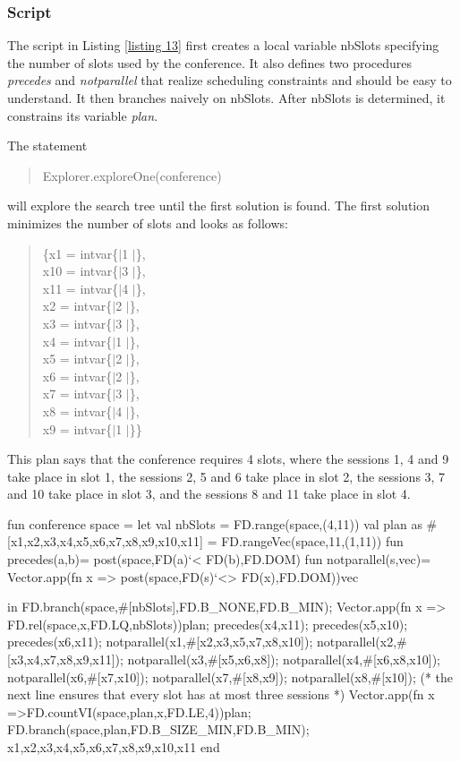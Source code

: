 \documentclass[a4paper,halfparskip]{scrartcl}
\begin{document}
\subsubsection{Script}
The script in Listing \ref{listing 13} first creates a local
variable nbSlots specifying the number of slots used by the 
conference. It also defines two procedures \emph{precedes} and
\emph{notparallel} that realize scheduling constraints and
should be easy to understand. It then branches naively on
nbSlots. After nbSlots is determined, it constrains its 
variable \emph{plan}.

The statement 
\begin{quote}
Explorer.exploreOne(conference)
\end{quote}
will explore the search tree until the first solution is found. 
The first solution minimizes the number of slots and looks as follows: 
\begin{quote}
\{x1 = intvar\{$|$1 $|$\},\\
  x10 = intvar\{$|$3 $|$\}, \\
 x11 = intvar\{$|$4 $|$\}, \\
 x2 = intvar\{$|$2 $|$\}, \\
 x3 = intvar\{$|$3 $|$\},\\ 
 x4 = intvar\{$|$1 $|$\}, \\
 x5 = intvar\{$|$2 $|$\}, \\
 x6 = intvar\{$|$2 $|$\}, \\
 x7 = intvar\{$|$3 $|$\}, \\
 x8 = intvar\{$|$4 $|$\}, \\
 x9 = intvar\{$|$1 $|$\}\}
\end{quote}
This plan says that the conference requires 4 slots, 
where the sessions 1, 4 and 9 take place in slot 1, the sessions 2, 
5 and 6 take place in slot 2, the sessions 3, 7 and 10 take place in 
slot 3, and the sessions 8 and 11 take place in slot 4. 
\begin{myverbatim}
fun conference space =
    let 
        val nbSlots = FD.range(space,(4,11)) 
        val plan as 
           #[x1,x2,x3,x4,x5,x6,x7,x8,x9,x10,x11] =
           FD.rangeVec(space,11,(1,11))
        fun precedes(a,b)= post(space,FD(a)`< FD(b),FD.DOM)
        fun notparallel(s,vec)= Vector.app(fn x => 
            post(space,FD(s)`<> FD(x),FD.DOM))vec
        
    in
        FD.branch(space,#[nbSlots],FD.B_NONE,FD.B_MIN);
        Vector.app(fn x => FD.rel(space,x,FD.LQ,nbSlots))plan;
        precedes(x4,x11);
        precedes(x5,x10);
        precedes(x6,x11);
        notparallel(x1,#[x2,x3,x5,x7,x8,x10]);
        notparallel(x2,#[x3,x4,x7,x8,x9,x11]);
        notparallel(x3,#[x5,x6,x8]);
        notparallel(x4,#[x6,x8,x10]);
        notparallel(x6,#[x7,x10]);
        notparallel(x7,#[x8,x9]);
        notparallel(x8,#[x10]);
        (* the next line ensures that every slot has at most 
           three sessions *)
        Vector.app(fn x =>FD.countVI(space,plan,x,FD.LE,4))plan;
        FD.branch(space,plan,FD.B_SIZE_MIN,FD.B_MIN);
        {x1,x2,x3,x4,x5,x6,x7,x8,x9,x10,x11}
    end
\end{myverbatim}
\end{document}
